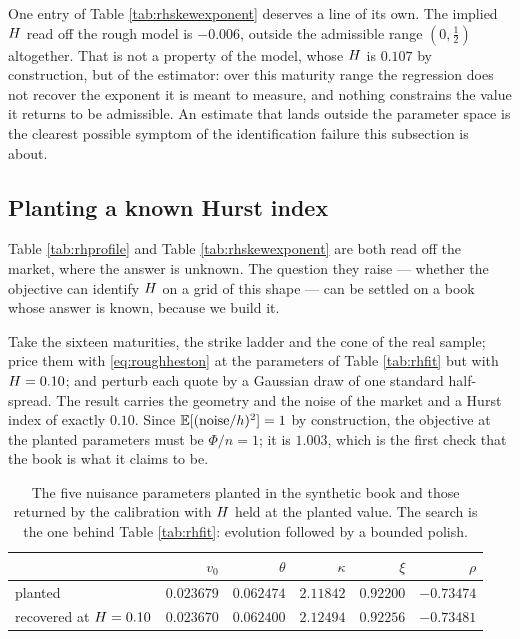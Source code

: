 One entry of Table \ref{tab:rhskewexponent} deserves a line of its own. The implied $H$ read
off the rough model is $-0.006$, outside the admissible range $(0,\tfrac12)$ altogether. That is not
a property of the model, whose $H$ is $0.107$ by construction, but of the estimator: over this
maturity range the regression does not recover the exponent it is meant to measure, and nothing
constrains the value it returns to be admissible. An estimate that lands outside the parameter space
is the clearest possible symptom of the identification failure this subsection is about.

\subsection{Planting a known Hurst index}
\label{subsec:rhplant}

Table \ref{tab:rhprofile} and Table \ref{tab:rhskewexponent} are both read off the market, where the
answer is unknown. The question they raise --- whether the objective can identify $H$ on a grid
of this shape --- can be settled on a book whose answer is known, because we build it.

Take the sixteen maturities, the strike ladder and the cone of the real sample; price them with
\eqref{eq:roughheston} at the parameters of Table \ref{tab:rhfit} but with $H=0.10$; and
perturb each quote by a Gaussian draw of one standard half-spread. The result carries the geometry
and the noise of the market and a Hurst index of exactly $0.10$. Since
$\mathbb{E}[(\text{noise}/h)^{2}]=1$ by construction, the objective at the planted parameters must be
$\Phi/n=1$; it is $1.003$, which is the first check that the book is what it claims to be.

\begin{table}[H]
\centering
\small
\begin{tabular}{lrrrrr}
\hline
 & $v_{0}$ & $\theta$ & $\kappa$ & $\xi$ & $\rho$\\
\hline
planted & $0.023679$ & $0.062474$ & $2.11842$ & $0.92200$ & $-0.73474$\\
recovered at $H=0.10$ & $0.023670$ & $0.062400$ & $2.12494$ & $0.92256$ & $-0.73481$\\
\hline
\end{tabular}
\caption[Planted and recovered parameters]{The five nuisance parameters planted in the synthetic book and those returned by the
calibration with $H$ held at the planted value. The search is the one behind Table
\ref{tab:rhfit}:  evolution followed by a bounded polish.}
\label{tab:rhplant}
\end{table}

